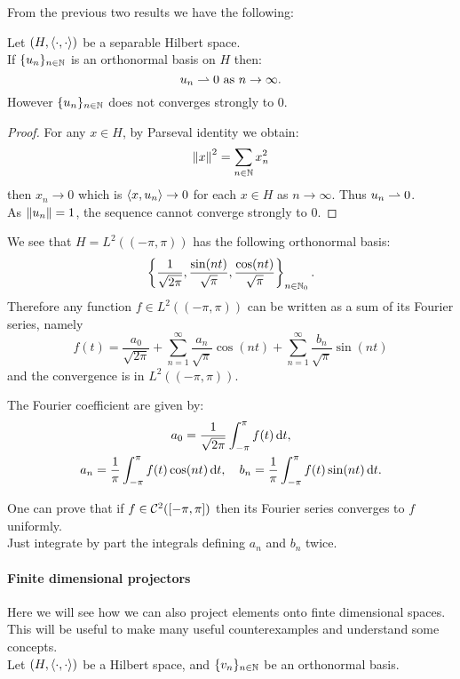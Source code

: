 From the previous two results we have the following:
\begin{coro}
	Let $(H, \left\langle\cdot, \cdot\right\rangle )$ be a separable Hilbert space.\\
	If $\{u_n\}_{n \in \mathbb N}$ is an orthonormal basis on $H$ then:
	$$
	u_n 
	\rightharpoonup 0 
	\text{ as }n \to \infty
	.
	$$
	However $\{u_n\}_{n \in \mathbb N}$ does not converges strongly to $0$.
\end{coro}
\begin{proof}
	For any $x \in H$, by Parseval identity we obtain:
	$$\left\lVert x\right\rVert^2 
	= \sum_{n \in \mathbb N} x^2_n
	$$
	then $x_n \to 0$ which is $\left\langle x, u_n\right\rangle \to 0$ for each $x \in H$ as $n \to \infty$.
	Thus $u_n \rightharpoonup 0$.\\
	As $\left\lVert u_n\right\rVert = 1$, the sequence cannot converge strongly to $0$.
\end{proof}
\begin{exam}
	We see that $H = L^2((-\pi, \pi))$ has the following orthonormal basis:
	$$
	\left\{
	\frac{1}{\sqrt{2\pi}}, 
	\frac{\sin(nt)}{\sqrt \pi}, 
	\frac{\cos(nt)}{\sqrt \pi}
	\right\}_{n \in \mathbb N_0}
	.
	$$
	Therefore any function $f \in L^2((-\pi, \pi))$ can be written as a sum of its Fourier series, namely
	$$
	f(t)
	= \frac{a_0}{\sqrt{2\pi}}
	+ \sum_{n=1}^\infty \frac{a_n}{\sqrt{\pi}} \cos(nt)
	+ \sum_{n=1}^\infty \frac{b_n}{\sqrt{\pi}} \sin(nt)
	$$
	and the convergence is in $L^2((-\pi,\pi))$.
	
	The Fourier coefficient are given by:
	\begin{gather*}
	a_0
	= \frac{1}{\sqrt{2\pi}}\int_{-\pi}^\pi f(t)\, \mathrm d t
	, \\
	a_n
	= \frac 1 \pi \int_{-\pi}^\pi f(t) \cos(nt) \, \mathrm d t
	, \quad
	b_n
	= \frac 1 \pi \int_{-\pi}^\pi f(t) \sin(nt) \, \mathrm d t
	.
	\end{gather*}
	
	One can prove that if $f \in \mathcal C^2([-\pi, \pi])$ then its Fourier series converges to $f$ uniformly.\\
	Just integrate by part the integrals defining $a_n$ and $b_n$ twice.
\end{exam}

\paragraph{Finite dimensional projectors}
Here we will see how we can also project elements onto finte dimensional spaces.
This will be useful to make many useful counterexamples and understand some concepts.\\
Let $(H, \left\langle \cdot, \cdot\right\rangle)$ be a Hilbert space, and $\{v_n\}_{n \in \mathbb N}$ be an orthonormal basis.

